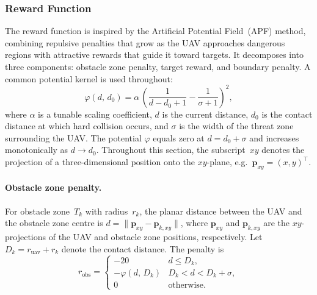 \subsubsection{Reward Function}
\label{subsubsec:reward}

The reward function is inspired by the Artificial Potential Field~(APF) method,
combining repulsive penalties that grow as the UAV approaches dangerous regions
with attractive rewards that guide it toward targets.
It decomposes into three components: obstacle zone penalty, target reward,
and boundary penalty.
A common potential kernel is used throughout:
\begin{equation}
  \varphi(d,\,d_0) =
    \alpha\,
    \left(
      \frac{1}{d - d_0 + 1}
      - \frac{1}{\sigma + 1}
    \right)^{\!2},
  \label{eq:apf_kernel}
\end{equation}
where $\alpha$ is a tunable scaling coefficient, $d$ is the current distance,
$d_0$ is the contact distance at which hard collision occurs, and
$\sigma$ is the width of the threat zone surrounding the UAV.
The potential $\varphi$ equals zero at $d = d_0 + \sigma$ and increases
monotonically as $d \to d_0$.
Throughout this section, the subscript~$xy$ denotes the projection of a
three-dimensional position onto the $xy$-plane, e.g.\
$\mathbf{p}_{xy} = (x, y)^{\top}$.

\paragraph{Obstacle zone penalty.}
For obstacle zone~$T_k$ with radius~$r_k$, the planar distance between the
UAV and the obstacle zone centre is
$d = \lVert\mathbf{p}_{xy} - \mathbf{p}_{k,xy}\rVert$,
where $\mathbf{p}_{xy}$ and $\mathbf{p}_{k,xy}$ are the $xy$-projections of
the UAV and obstacle zone positions, respectively.
Let $D_k = r_{\mathrm{uav}} + r_k$ denote the contact distance.
The penalty is
\begin{equation}
  r_{\mathrm{obs}} =
  \begin{cases}
    -20 & d \le D_k, \\[3pt]
    -\varphi(d,\, D_k)
    & D_k < d < D_k + \sigma, \\[3pt]
    0 & \text{otherwise}.
  \end{cases}
  \label{eq:r_obs}
\end{equation}

